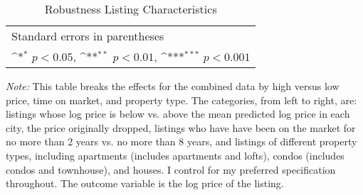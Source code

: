 \begin{landscape}
	\begin{table}[htbp]\centering
		\def\sym#1{\ifmmode^{#1}\else\(^{#1}\)\fi}
		\caption{Robustness Listing Characteristics}
		\begin{tabular}{l*{9}{c}}
			\hline\hline
			
			\hline\hline
			\multicolumn{10}{l}{\footnotesize Standard errors in parentheses}\\
			\multicolumn{10}{l}{\footnotesize \sym{*} \(p<0.05\), \sym{**} \(p<0.01\), \sym{***} \(p<0.001\)}\\
		\end{tabular}
\label{table:robustlisting}
	
		\begin{tablenotes}
			\item {\it Note:} This table breaks the effects for the combined data by high versus low price, time on market, and property type. The categories, from left to right, are: listings whose log price is below vs. above the mean predicted log price in each city, the price originally dropped, listings who have have been on the market for no more than 2 years vs. no more than 8 years, and listings of different property types, including apartments (includes apartments and lofts), condos (includes condos and townhouse), and houses. I control for my preferred specification throughout. The outcome variable is the log price of the listing.
		\end{tablenotes}
	\end{table}
\end{landscape}

